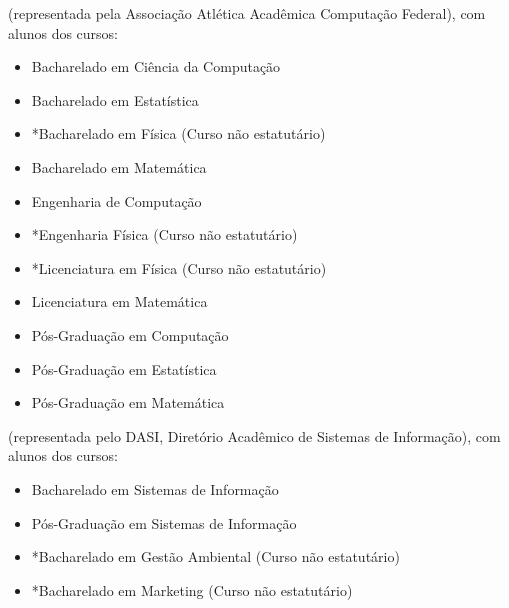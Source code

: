 \begin{article}
\begin{description}[noitemsep]
		\item[UFSCar] (representada pela Associação Atlética Acadêmica Computação Federal), com alunos dos cursos:
		\begin{itemize}[noitemsep]
			\item Bacharelado em Ciência da Computação
			\item Bacharelado em Estatística
			\item *Bacharelado em Física (Curso não estatutário)
			\item Bacharelado em Matemática
			\item Engenharia de Computação
			\item *Engenharia Física (Curso não estatutário)
			\item *Licenciatura em Física (Curso não estatutário)
			\item Licenciatura em Matemática
			\item Pós-Graduação em Computação
			\item Pós-Graduação em Estatística
			\item Pós-Graduação em Matemática
		\end{itemize}

		\item[USP Leste - EACH] (representada pelo DASI, Diretório Acadêmico de Sistemas de Informação), com alunos dos cursos:
		\begin{itemize}[noitemsep]
			\item Bacharelado em Sistemas de Informação
			\item Pós-Graduação em Sistemas de Informação
			\item *Bacharelado em Gestão Ambiental (Curso não estatutário)
			\item *Bacharelado em Marketing (Curso não estatutário)
		\end{itemize}


\end{description}
\end{article}

